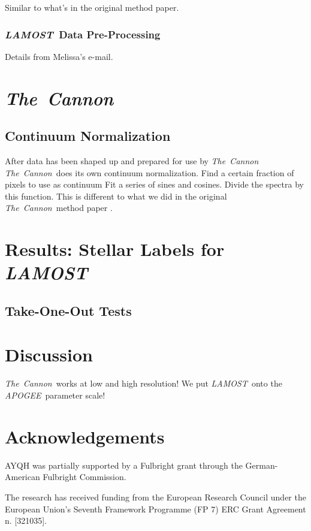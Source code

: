 \documentclass[12pt, preprint]{aastex}
\newcommand{\tc}{\textsl{The~Cannon}}
\newcommand{\apogee}{\textsl{APOGEE}}
\newcommand{\lamost}{\textsl{LAMOST}}
\begin{document}
Similar to what's in the original method paper.

\subsubsection{\lamost\ Data Pre-Processing}

Details from Melissa's e-mail.

\section{\tc}

\subsection{Continuum Normalization}

After data has been shaped up and prepared for use by \tc\, \tc\ does its own
continuum normalization. Find a certain fraction of pixels to use as continuum
Fit a series of sines and cosines. Divide the spectra by this function. This 
is different to what we did in the original \tc\ method paper \citep{ness2015}. 


\section{Results: Stellar Labels for \lamost}

\subsection{Take-One-Out Tests}

\section{Discussion}

\tc\ works at low and high resolution! We put \lamost\ onto the \apogee\ 
parameter scale!

\section{Acknowledgements}

AYQH was partially supported by a Fulbright grant through the German-American
Fulbright Commission.

The research has received funding from the European Research Council under the 
European Union's Seventh Framework Programme (FP 7) ERC Grant Agreement n.
[321035].
\end{document}
